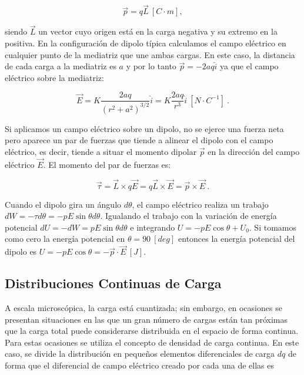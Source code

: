 \documentclass{tufte-handout}
\begin{document}
\begin{equation}
\vec{p} = q\vec{L}~[C\cdot m],
\end{equation}

siendo $\vec{L}$ un vector cuyo origen está en la carga negativa y su extremo en la positiva. En la configuración de dipolo típica calculamos el campo eléctrico en cualquier punto de la mediatriz que une ambas cargas. En este caso, la distancia de cada carga a la mediatriz es $a$ y por lo tanto $\vec{p} = -2aq\hat{i}$ ya que el campo eléctrico sobre la mediatriz:

\begin{equation}
\vec{E} = K\frac{2aq}{(r^2 + a^2)^{3/2}}\hat{i} = K\frac{2aq}{r^3}\hat{i}~[N\cdot C^{-1}]~.
\end{equation}

Si aplicamos un campo eléctrico sobre un dipolo, no se ejerce una fuerza neta pero aparece un par de fuerzas que tiende a alinear el dipolo con el campo eléctrico, es decir, tiende a situar el momento dipolar $\vec{p}$ en la dirección del campo eléctrico $\vec{E}$. El momento del par de fuerzas es:

\begin{equation}
\vec{\tau} = \vec{L} \times q\vec{E} = q\vec{L} \times \vec{E} = \vec{p} \times \vec{E}~.
\end{equation}

Cuando el dipolo gira un ángulo $d\theta$, el campo eléctrico realiza un trabajo $dW = -\tau d\theta = -pE\sin{\theta}d\theta$. Igualando el trabajo con la variación de energía potencial $dU = -dW = pE\sin{\theta}d\theta$ e integrando $U = -pE\cos{\theta} + U_0$. Si tomamos como cero la energía potencial en $\theta = 90~[deg]$ entonces la energía potencial del dipolo es $U = -pE\cos{\theta} = -\vec{p}\cdot \vec{E}~[J]$.

\newpage

\subsection{Distribuciones Continuas de Carga}

A escala microscópica, la carga está cuantizada; sin embargo, en ocasiones se presentan situaciones en las que un gran número de cargas están tan próximas que la carga total puede considerarse distribuida en el espacio de forma continua. Para estas ocasiones se utiliza el concepto de densidad de carga continua. En este caso, se divide la distribución en pequeños elementos diferenciales de carga $dq$ de forma que el diferencial de campo eléctrico creado por cada una de ellas es
\end{document}
